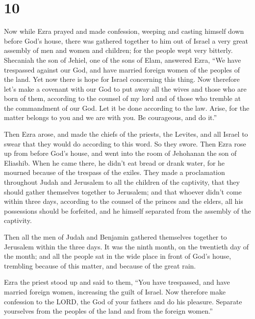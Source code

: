\hypertarget{section-9}{%
\section{10}\label{section-9}}

 Now while Ezra prayed and made confession, weeping and
casting himself down before God's house, there was gathered together to
him out of Israel a very great assembly of men and women and children;
for the people wept very bitterly.  Shecaniah the son of
Jehiel, one of the sons of Elam, answered Ezra, ``We have trespassed
against our God, and have married foreign women of the peoples of the
land. Yet now there is hope for Israel concerning this thing.
 Now therefore let's make a covenant with our God to put
away all the wives and those who are born of them, according to the
counsel of my lord and of those who tremble at the commandment of our
God. Let it be done according to the law.  Arise, for the
matter belongs to you and we are with you. Be courageous, and do it.''

 Then Ezra arose, and made the chiefs of the priests, the
Levites, and all Israel to swear that they would do according to this
word. So they swore.  Then Ezra rose up from before God's
house, and went into the room of Jehohanan the son of Eliashib. When he
came there, he didn't eat bread or drank water, for he mourned because
of the trespass of the exiles.  They made a proclamation
throughout Judah and Jerusalem to all the children of the captivity,
that they should gather themselves together to Jerusalem; 
and that whoever didn't come within three days, according to the counsel
of the princes and the elders, all his possessions should be forfeited,
and he himself separated from the assembly of the captivity.

 Then all the men of Judah and Benjamin gathered
themselves together to Jerusalem within the three days. It was the ninth
month, on the twentieth day of the month; and all the people sat in the
wide place in front of God's house, trembling because of this matter,
and because of the great rain.

 Ezra the priest stood up and said to them, ``You have
trespassed, and have married foreign women, increasing the guilt of
Israel.  Now therefore make confession to the LORD, the
God of your fathers and do his pleasure. Separate yourselves from the
peoples of the land and from the foreign women.''

